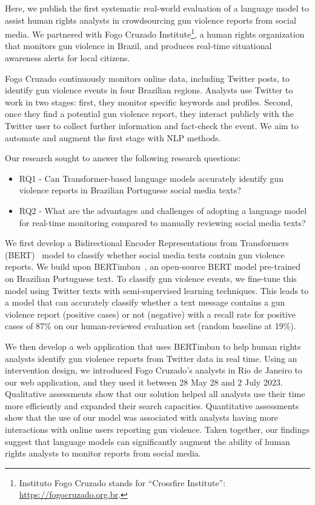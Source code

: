 \documentclass[11pt,letterpaper]{article}
\begin{document}
Here, we publish the first systematic real-world evaluation of a language model to assist human rights analysts in crowdsourcing gun violence reports from social media. We partnered with Fogo Cruzado Institute\footnote{Instituto Fogo Cruzado stands for ``Crossfire Institute'': \href{https://fogocruzado.org.br}{https://fogocruzado.org.br}.}, a human rights organization that monitors gun violence in Brazil, and produces real-time situational awareness alerts for local citizens. 

Fogo Cruzado continuously monitors online data, including Twitter posts, to identify gun violence events in four Brazilian regions. Analysts use Twitter to work in two stages: first, they monitor specific keywords and profiles. Second, once they find a potential gun violence report, they interact publicly with the Twitter user to collect further information and fact-check the event. We aim to automate and augment the first stage with NLP methods.

Our research sought to answer the following research questions:

\begin{itemize}
\item RQ1 - Can Transformer-based language models accurately identify gun violence reports in Brazilian Portuguese social media texts?

\item RQ2 - What are the advantages and challenges of adopting a language model for real-time monitoring compared to manually reviewing social media texts?
\end{itemize}

We first develop a Bidirectional Encoder Representations from Transformers (BERT)~\citep{devlinBERTPretrainingDeep2018} model to classify whether social media texts contain gun violence reports. We build upon BERTimbau~\citep{souzaBERTimbauPretrainedBERT2020}, an open-source BERT model pre-trained on Brazilian Portuguese text. To classify gun violence events, we fine-tune this model using Twitter texts with semi-supervised learning techniques. This leads to a model that can accurately classify whether a text message contains a gun violence report (positive cases) or not (negative) with a recall rate for positive cases of 87\% on our human-reviewed evaluation set (random baseline at 19\%).

We then develop a web application that uses BERTimbau to help human rights analysts identify gun violence reports from Twitter data in real time. Using an intervention design, we introduced Fogo Cruzado's analysts in Rio de Janeiro to our web application, and they used it between 28 May 28 and 2 July 2023.  Qualitative assessments show that our solution helped all analysts use their time more efficiently and expanded their search capacities. Quantitative assessments show that the use of our model was associated with analysts having more interactions with online users reporting gun violence. Taken together, our findings suggest that language models can significantly augment the ability of human rights analysts to monitor reports from social media.
\end{document}
